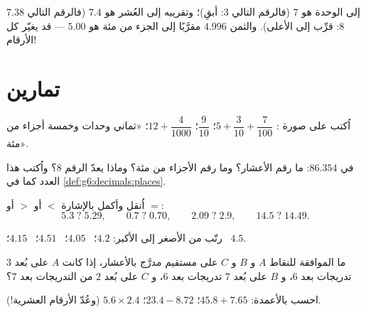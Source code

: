 \begin{example}
 $7.38$ إلى الوحدة هو $7$ (فالرقم التالي $3$: أبقِ)؛ وتقريبه إلى
العُشر هو $7.4$ (فالرقم التالي $8$: قرِّب إلى الأعلى). والثمن
$4.996$ مقرَّبًا إلى الجزء من مئة هو $5.00$ ---  قد يغيّر
كل الأرقام!
\end{example}

\section{تمارين}

\begin{exercise}[$\star$]\label{exo:g6:decimals:1}
اُكتب على صورة : $5 + \dfrac{3}{10} + \dfrac{7}{100}$؛
\quad $\dfrac{9}{10}$؛ \quad $12 + \dfrac{4}{1000}$؛
\quad «ثماني وحدات وخمسة أجزاء من مئة».
\end{exercise}

\begin{exercise}[$\star$]\label{exo:g6:decimals:2}
في $86.354$: ما رقم الأعشار؟ وما رقم الأجزاء من مئة؟ وماذا
يعدّ الرقم $8$؟ واُكتب هذا العدد كما في
\cref{def:g6:decimals:places}.
\end{exercise}

\begin{exercise}[$\star$]\label{exo:g6:decimals:3}
اُنقل وأكمل بالإشارة $<$ أو $>$ أو $=$:
\[
5.3 \;?\; 5.29, \qquad
0.7 \;?\; 0.70, \qquad
2.09 \;?\; 2.9, \qquad
14.5 \;?\; 14.49 .
\]
\end{exercise}

\begin{exercise}[$\star$]\label{exo:g6:decimals:4}
رتّب من الأصغر إلى الأكبر:
$4.2$؛ \ $4.05$؛ \ $4.51$؛ \ $4.15$؛ \ $4.5$.
\end{exercise}

\begin{exercise}[$\star$]\label{exo:g6:decimals:5}
ما  الموافقة للنقاط $A$ و $B$ و $C$ على
مستقيم مدرَّج بالأعشار، إذا كانت $A$ على بُعد $3$ تدريجات بعد $6$،
و $B$ على بُعد $7$ تدريجات بعد $6$، و $C$ على بُعد $2$ من التدريجات بعد $7$؟
\end{exercise}

\begin{exercise}[$\star$]\label{exo:g6:decimals:6}
احسب بالأعمدة: $45.8 + 7.65$؛ \quad $23.4 - 8.72$؛ \quad
$5.6 \times 2.4$ (وعُدّ الأرقام العشرية!).
\end{exercise}


